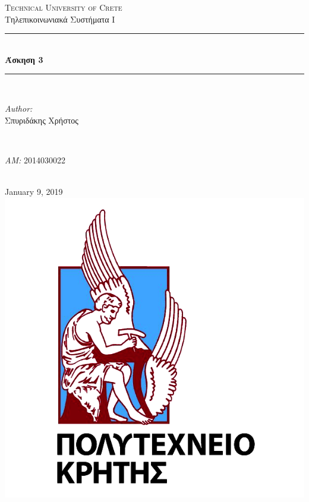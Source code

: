 \documentclass[11pt]{article}
\begin{document}
    \begin{titlepage}
        \center
        \textsc{\LARGE Technical University of Crete}\\[2cm] 
        \Large Τηλεπικοινωνιακά Συστήματα Ι\\[1cm] 
        
        \rule{\linewidth}{0.5mm} \\[0.5cm]
            { \huge \bfseries Άσκηση 3}\\[0.5cm]
        \rule{\linewidth}{0.5mm} \\[2.5cm]
        
        \begin{minipage}{0.4\textwidth}
            \begin{flushleft} \large
                \emph{Author:}\\
                    Σπυριδάκης Χρήστος
            \end{flushleft}
        \end{minipage}
        ~
        \begin{minipage}{0.4\textwidth}
            \begin{flushright} \large
                \emph{ΑΜ:} 2014030022
            \end{flushright}
        \end{minipage}\\[4cm]
        
        {\large January 9, 2019}\\[2cm] 
        \includegraphics[scale=0.5]{TUC.png} 
        \vfill
    \end{titlepage}
\end{document}
